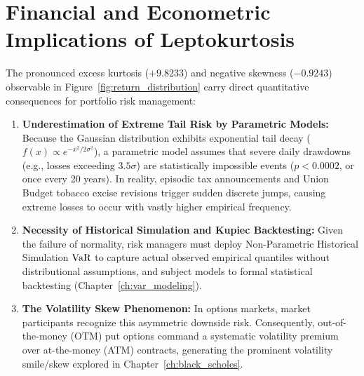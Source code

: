 \section{Financial and Econometric Implications of Leptokurtosis}
\label{sec:leptokurtosis_implications}

The pronounced excess kurtosis ($+9.8233$) and negative skewness ($-0.9243$) observable in Figure~\ref{fig:return_distribution} carry direct quantitative consequences for portfolio risk management:
\begin{enumerate}
    \item \textbf{Underestimation of Extreme Tail Risk by Parametric Models:} Because the Gaussian distribution exhibits exponential tail decay ($f(x) \propto e^{-x^2 / 2\sigma^2}$), a parametric model assumes that severe daily drawdowns (e.g., losses exceeding $3.5\sigma$) are statistically impossible events ($p < 0.0002$, or once every 20 years). In reality, episodic tax announcements and Union Budget tobacco excise revisions trigger sudden discrete jumps, causing extreme losses to occur with vastly higher empirical frequency.
    \item \textbf{Necessity of Historical Simulation and Kupiec Backtesting:} Given the failure of normality, risk managers must deploy Non-Parametric Historical Simulation $\operatorname{VaR}$ to capture actual observed empirical quantiles without distributional assumptions, and subject models to formal statistical backtesting (Chapter~\ref{ch:var_modeling}).
    \item \textbf{The Volatility Skew Phenomenon:} In options markets, market participants recognize this asymmetric downside risk. Consequently, out-of-the-money (OTM) put options command a systematic volatility premium over at-the-money (ATM) contracts, generating the prominent volatility smile/skew explored in Chapter~\ref{ch:black_scholes}.
\end{enumerate}

